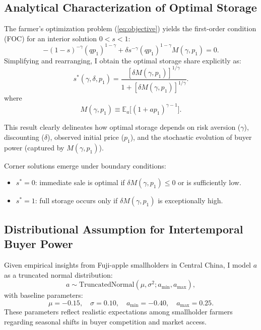 \documentclass[12pt]{article}
\begin{document}
\subsection{Analytical Characterization of Optimal Storage}
The farmer’s optimization problem (\ref{eq:objective}) yields the first-order condition (FOC) for an interior solution \( 0 < s < 1 \):
\begin{equation}
    -(1 - s)^{-\gamma}(q p_1)^{1 - \gamma} + \delta s^{-\gamma}\left(q p_1\right)^{1 - \gamma} M(\gamma, p_1) = 0.
\end{equation}
Simplifying and rearranging, I obtain the optimal storage share explicitly as:
\begin{equation}
\label{eq:s_star}
    s^*(\gamma, \delta, p_1) = \frac{\left[\delta M(\gamma, p_1)\right]^{1/\gamma}}{1 + \left[\delta M(\gamma, p_1)\right]^{1/\gamma}}.
\end{equation}
where
\begin{equation}
\label{eq:M_definition}
    M(\gamma, p_1) \equiv \mathbb{E}_a\big[(1 + a p_1)^{\gamma - 1}\big].
\end{equation}

This result clearly delineates how optimal storage depends on risk aversion (\(\gamma\)), discounting (\(\delta\)), observed initial price (\(p_1\)), and the stochastic evolution of buyer power (captured by \(M(\gamma, p_1)\)).

Corner solutions emerge under boundary conditions:
\begin{itemize}
    \item \(s^* = 0\): immediate sale is optimal if \(\delta M(\gamma, p_1) \leq 0\) or is sufficiently low.
    \item \(s^* = 1\): full storage occurs only if \(\delta M(\gamma, p_1)\) is exceptionally high.
\end{itemize}

\subsection{Distributional Assumption for Intertemporal Buyer Power}

Given empirical insights from Fuji-apple smallholders in Central China, I model \(a\) as a truncated normal distribution:
\begin{equation}
    a \sim \text{TruncatedNormal}(\mu, \sigma^2; a_{\text{min}}, a_{\text{max}}),
\end{equation}
with baseline parameters:
\begin{equation}
    \mu = -0.15, \quad \sigma = 0.10, \quad a_{\text{min}} = -0.40, \quad a_{\text{max}} = 0.25.
\end{equation}
These parameters reflect realistic expectations among smallholder farmers regarding seasonal shifts in buyer competition and market access.
\end{document}
